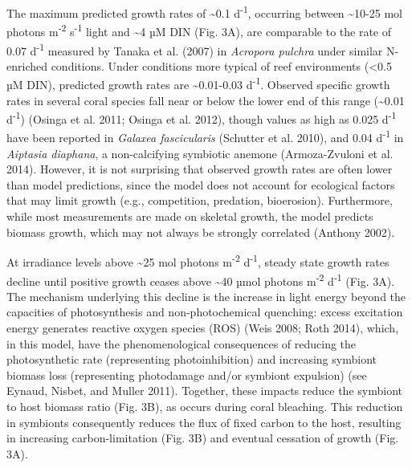 \documentclass[]{elsarticle} %
\begin{document}
The maximum predicted growth rates of \textasciitilde{}0.1
d\textsuperscript{-1}, occurring between \textasciitilde{}10-25 mol
photons m\textsuperscript{-2} s\textsuperscript{-1} light and
\textasciitilde{}4 µM DIN (Fig. 3A), are comparable to the rate of 0.07
d\textsuperscript{-1} measured by Tanaka et al. (2007) in \emph{Acropora
pulchra} under similar N-enriched conditions. Under conditions more
typical of reef environments (\textless{}0.5 µM DIN), predicted growth
rates are \textasciitilde{}0.01-0.03 d\textsuperscript{-1}. Observed
specific growth rates in several coral species fall near or below the
lower end of this range (\textasciitilde{}0.01 d\textsuperscript{-1})
(Osinga et al. 2011; Osinga et al. 2012), though values as high as 0.025
d\textsuperscript{-1} have been reported in \emph{Galaxea fascicularis}
(Schutter et al. 2010), and 0.04 d\textsuperscript{-1} in \emph{Aiptasia
diaphana}, a non-calcifying symbiotic anemone (Armoza-Zvuloni et al.
2014). However, it is not surprising that observed growth rates are
often lower than model predictions, since the model does not account for
ecological factors that may limit growth (e.g., competition, predation,
bioerosion). Furthermore, while most measurements are made on skeletal
growth, the model predicts biomass growth, which may not always be
strongly correlated (Anthony 2002).

At irradiance levels above \textasciitilde{}25 mol photons
m\textsuperscript{-2} d\textsuperscript{-1}, steady state growth rates
decline until positive growth ceases above \textasciitilde{}40 µmol
photons m\textsuperscript{-2} d\textsuperscript{-1} (Fig. 3A). The
mechanism underlying this decline is the increase in light energy beyond
the capacities of photosynthesis and non-photochemical quenching: excess
excitation energy generates reactive oxygen species (ROS) (Weis 2008;
Roth 2014), which, in this model, have the phenomenological consequences
of reducing the photosynthetic rate (representing photoinhibition) and
increasing symbiont biomass loss (representing photodamage and/or
symbiont expulsion) (see Eynaud, Nisbet, and Muller 2011). Together,
these impacts reduce the symbiont to host biomass ratio (Fig. 3B), as
occurs during coral bleaching. This reduction in symbionts consequently
reduces the flux of fixed carbon to the host, resulting in increasing
carbon-limitation (Fig. 3B) and eventual cessation of growth (Fig. 3A).
\end{document}
